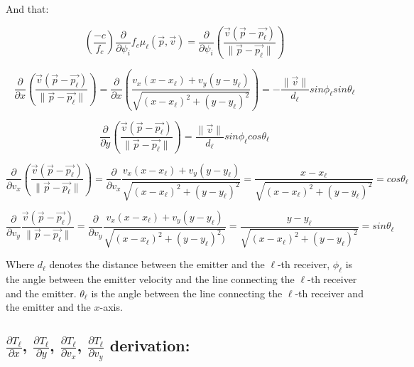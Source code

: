 And that:

\begin{equation} 
(\frac{-c}{f_c})\frac{\partial}{\partial \psi_i} f_c \mu_\ell(\vec{p},\vec{v})=\frac{\partial}{\partial \psi_i}(\frac{\vec{v}(\vec{p}-\vec{p_\ell})}{\|\vec{p} -\vec{p_\ell}\|})                                                           
\end{equation}


\begin{equation}
\frac{\partial}{\partial x} (\frac{\vec{v}(\vec{p}-\vec{p_\ell})}{\|\vec{p}-\vec{p_\ell}\|})=\frac{\partial}{\partial x}(\frac{v_x (x-x_\ell )+v_y (y-y_\ell )}{\sqrt{(x-x_\ell )^2+(y-y_\ell )^2}})=-\frac{\|\vec{v}\|}{d_\ell}  sin \phi_\ell sin\theta_\ell
\end{equation}

\begin{equation}
\frac{\partial}{\partial y} (\frac{\vec{v}(\vec{p}-\vec{p_\ell})}{\|\vec{p}-\vec{p_\ell}\|})=\frac{\|\vec{v}\|}{d_\ell}  sin\phi_\ell cos\theta_\ell                                                           
\end{equation}

\begin{equation}
\frac{\partial}{\partial v_x} (\frac{\vec{v}(\vec{p}-\vec{p_\ell})}{\|\vec{p}-\vec{p_\ell}\|})=\frac{\partial}{\partial v_x} \frac{v_x(x-x_\ell )+v_y(y-y_\ell)}{\sqrt{(x-x_\ell )^2+(y-y_\ell )^2}}=\frac{x-x_\ell}{\sqrt{(x-x_\ell )^2+(y-y_\ell )^2}}=cos\theta_\ell
\end{equation}

\begin{equation}
\frac{\partial}{\partial v_y} \frac{\vec{v}(\vec{p}-\vec{p_\ell})}{\|\vec{p}-\vec{p_\ell}\|}=\frac{\partial}{\partial v_y}\frac{v_x (x-x_\ell )+v_y (y-y_\ell )}{\sqrt{(x-x_\ell )^2+(y-y_\ell )^2 )}}=\frac{y-y_\ell}{\sqrt{(x-x_\ell )^2+(y-y_\ell )^2}}=sin\theta_\ell
\end{equation}

Where $d_\ell$ denotes the distance between the emitter and the $\ell$-th receiver, $\phi_\ell$ is the angle between the emitter velocity and the line connecting the $\ell$-th receiver and the emitter. $\theta_\ell$ is the angle between the line connecting the $\ell$-th receiver and the emitter and the $x$-axis.

\subsection{$\frac{\partial T_\ell}{\partial x}$, $\frac{\partial T_\ell}{\partial y}$,
$\frac{\partial T_\ell}{\partial v_x}$, $\frac{\partial T_\ell}{\partial v_y}$
 derivation:}
 
